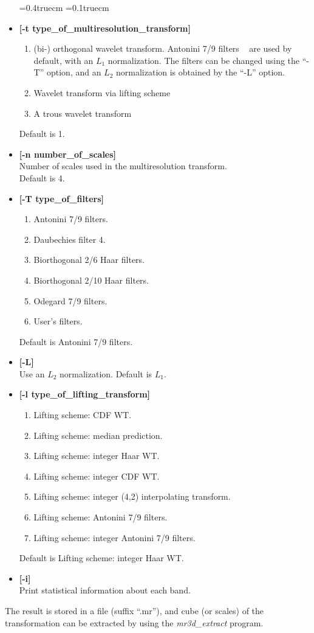 \begin{itemize} 
\baselineskip=0.4truecm
\itemsep=0.1truecm
\item {\bf [-t type\_of\_multiresolution\_transform]}
{\small 
\begin{enumerate}
\item  (bi-) orthogonal wavelet transform.  
Antonini 7/9 filters ~\cite{wave:antonini92} are used by default, with an 
$L_1$ normalization. The filters can be changed using the ``-T'' option, and
an $L_2$ normalization is obtained by the ``-L'' option.
\item Wavelet transform via lifting scheme 
\item A trous wavelet transform
\end{enumerate}}
Default is 1.
\item {\bf [-n number\_of\_scales]} \\
 Number of scales used in the multiresolution transform. \\
 Default is 4.
\item {\bf [-T type\_of\_filters]}  
{\small
\begin{enumerate}
\itemsep=0.1truecm
\item Antonini 7/9 filters. 
\item Daubechies filter 4. 
\item Biorthogonal 2/6 Haar filters.
\item Biorthogonal 2/10 Haar filters.
\item Odegard 7/9 filters.
\item User's filters.
\end{enumerate}}
Default is Antonini 7/9 filters.
\item {\bf [-L]} \\
Use an $L_2$ normalization. Default is $L_1$.
\item {\bf [-l type\_of\_lifting\_transform]}  
{\small 
\begin{enumerate}
\baselineskip=0.4truecm
\item Lifting scheme: CDF WT. 
\item Lifting scheme: median prediction.
\item Lifting scheme: integer Haar WT. 
\item Lifting scheme: integer CDF WT. 
\item Lifting scheme: integer (4,2) interpolating transform. 
\item Lifting scheme:  Antonini 7/9 filters.
\item Lifting scheme: integer Antonini 7/9 filters. 
\end{enumerate}}
 Default is Lifting scheme: integer Haar WT.  
\item {\bf [-i]} \\
Print statistical information about each band.
\end{itemize}
The result is stored in a file (suffix ``.mr''),
and cube (or scales) of the transformation can be extracted
by using the {\em mr3d\_extract} program. \\
